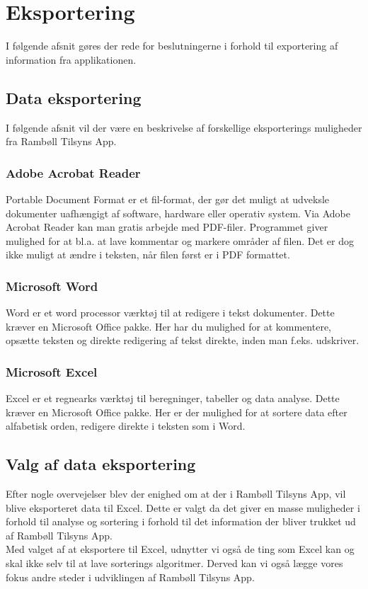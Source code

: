 \section{Eksportering}                                   
I følgende afsnit gøres der rede for beslutningerne i forhold til exportering af information fra applikationen.

\subsection{Data eksportering}
I følgende afsnit vil der være en beskrivelse af forskellige eksporterings muligheder fra Rambøll Tilsyns App.

\subsubsection{Adobe Acrobat Reader}
Portable Document Format\cite{PDF} er et fil-format, der gør det muligt at udveksle dokumenter uafhængigt af software, hardware eller operativ system.
Via Adobe Acrobat Reader\cite{AdobeReader} kan man gratis arbejde med PDF-filer. Programmet giver mulighed for at bl.a. at lave kommentar og markere områder af filen. Det er dog ikke muligt at ændre i teksten, når filen først er i PDF formattet.

\subsubsection{Microsoft Word}
Word\cite{Office} er et word processor\cite{WordProcessor} værktøj til at redigere i tekst dokumenter.
Dette kræver en Microsoft Office pakke. Her har du mulighed for at kommentere, opsætte teksten og direkte redigering af tekst direkte, inden man f.eks. udskriver.

\subsubsection{Microsoft Excel}
Excel\cite{Office} er et regnearks værktøj til beregninger, tabeller og data analyse. 
Dette kræver en Microsoft Office pakke. Her er der mulighed for at sortere data efter alfabetisk orden, redigere direkte i teksten som i Word.

\subsection{Valg af data eksportering}
Efter nogle overvejelser blev der enighed om at der i Rambøll Tilsyns App, vil blive eksporteret data til Excel. Dette er valgt da det giver en masse muligheder i forhold til analyse og sortering i forhold til det information der bliver trukket ud af Rambøll Tilsyns App. \\
Med valget af at eksportere til Excel, udnytter vi også de ting som Excel kan og skal ikke selv til at lave sorterings algoritmer. Derved kan vi også lægge vores fokus andre steder i udviklingen af Rambøll Tilsyns App.